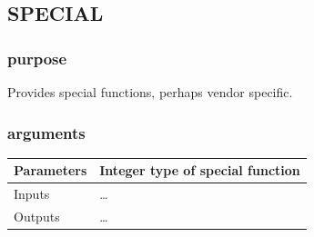 %            
%
%            
%
%
%            
%            
%



        \subsection{SPECIAL}

            \subsubsection{purpose}
            
                Provides special functions, perhaps vendor specific.
                
            \subsubsection{arguments}
            
                \begin{tabular}{| l | l |}
                \hline
                Parameters  & Integer type of special function \\
                \hline
                Inputs      & \ldots \\
                \hline
                Outputs     & \ldots \\
                \hline
                \end{tabular}

